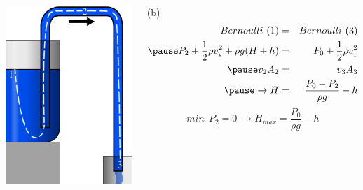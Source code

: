 \documentclass[]{beamer}
\begin{document}
\begin{frame}


  \begin{columns}[c]
    \column{2in}  %
 
    \begin{center}
      \includegraphics[height=2.in]{images2/Syphon_streamline.png}
    \end{center}

    \column{2.8in}
 
    \textcolor{mypink1}{  (b) 
    \begin{eqnarray*}
     Bernoulli~ (1)&=&Bernoulli~  (3) \\
     \pause
       P_2+\frac{1}{2}\rho v_2^2+\rho g (H+h)&=&P_0+\frac{1}{2}\rho v_1^2 \\
       \pause
       v_2A_2&=&v_3A_3\\
       \pause
      \rightarrow H&=& \frac{P_0-P_2}{\rho g}-h\\
    \end{eqnarray*}
    \pause
    \begin{equation*}
      min~~P_2=0~\rightarrow H_{max}=\boxed{\frac{P_0}{\rho g}-h}
    \end{equation*}
          }

    \end{columns}
 



  \end{frame}


\end{document}
